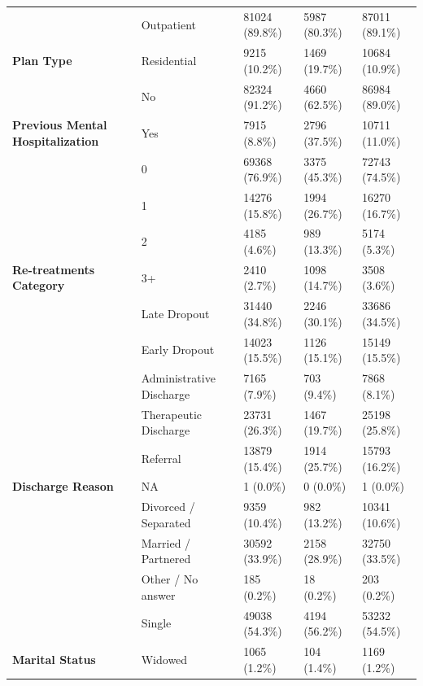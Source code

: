 \documentclass[
  spanish,
  10pt,
]{article}
\begin{document}
\begin{table}[H]
{\begin{tabular}[t]{>{}lllll}
\cmidrule{1-5}
 & Outpatient & 81024 (89.8\%) & 5987 (80.3\%) & 87011 (89.1\%)\\
\cmidrule{2-5}
\multirow[t]{-2}{*}{\raggedright\arraybackslash \textbf{Plan Type}} & Residential & 9215 (10.2\%) & 1469 (19.7\%) & 10684 (10.9\%)\\
\cmidrule{1-5}
 & No & 82324 (91.2\%) & 4660 (62.5\%) & 86984 (89.0\%)\\
\cmidrule{2-5}
\multirow[t]{-2}{*}{\raggedright\arraybackslash \textbf{Previous Mental Hospitalization}} & Yes & 7915 (8.8\%) & 2796 (37.5\%) & 10711 (11.0\%)\\
\cmidrule{1-5}
 & 0 & 69368 (76.9\%) & 3375 (45.3\%) & 72743 (74.5\%)\\
\cmidrule{2-5}
 & 1 & 14276 (15.8\%) & 1994 (26.7\%) & 16270 (16.7\%)\\
\cmidrule{2-5}
 & 2 & 4185 (4.6\%) & 989 (13.3\%) & 5174 (5.3\%)\\
\cmidrule{2-5}
\multirow[t]{-4}{*}{\raggedright\arraybackslash \textbf{Re-treatments Category}} & 3+ & 2410 (2.7\%) & 1098 (14.7\%) & 3508 (3.6\%)\\
\cmidrule{1-5}
 & Late Dropout & 31440 (34.8\%) & 2246 (30.1\%) & 33686 (34.5\%)\\
\cmidrule{2-5}
 & Early Dropout & 14023 (15.5\%) & 1126 (15.1\%) & 15149 (15.5\%)\\
\cmidrule{2-5}
 & Administrative Discharge & 7165 (7.9\%) & 703 (9.4\%) & 7868 (8.1\%)\\
\cmidrule{2-5}
 & Therapeutic Discharge & 23731 (26.3\%) & 1467 (19.7\%) & 25198 (25.8\%)\\
\cmidrule{2-5}
 & Referral & 13879 (15.4\%) & 1914 (25.7\%) & 15793 (16.2\%)\\
\cmidrule{2-5}
\multirow[t]{-6}{*}{\raggedright\arraybackslash \textbf{Discharge Reason}} & NA & 1 (0.0\%) & 0 (0.0\%) & 1 (0.0\%)\\
\cmidrule{1-5}
 & Divorced / Separated & 9359 (10.4\%) & 982 (13.2\%) & 10341 (10.6\%)\\
\cmidrule{2-5}
 & Married / Partnered & 30592 (33.9\%) & 2158 (28.9\%) & 32750 (33.5\%)\\
\cmidrule{2-5}
 & Other / No answer & 185 (0.2\%) & 18 (0.2\%) & 203 (0.2\%)\\
\cmidrule{2-5}
 & Single & 49038 (54.3\%) & 4194 (56.2\%) & 53232 (54.5\%)\\
\cmidrule{2-5}
\multirow[t]{-5}{*}{\raggedright\arraybackslash \textbf{Marital Status}} & Widowed & 1065 (1.2\%) & 104 (1.4\%) & 1169 (1.2\%)\\

\end{tabular}}
\end{table}
\end{document}
